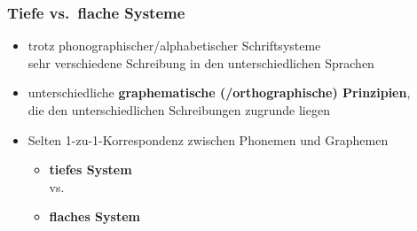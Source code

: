 \begin{frame}
\frametitle{Tiefe vs.\ flache Systeme}

\begin{itemize}
	\item trotz phonographischer/alphabetischer Schriftsysteme \ras\\
              sehr verschiedene Schreibung in den unterschiedlichen Sprachen

	\item unterschiedliche \textbf{graphematische (/orthographische) Prinzipien},\\
          die den unterschiedlichen Schreibungen zugrunde liegen

	\item Selten 1-zu-1-Korrespondenz zwischen Phonemen und Graphemen
	
	\begin{itemize}
		\item \textbf{tiefes System}\\ 
		vs.
		\item \textbf{flaches System}
	\end{itemize}
\end{itemize}
\end{frame}


